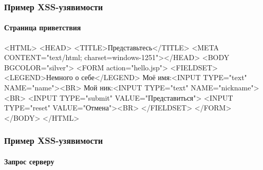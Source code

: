 \begin{frame}[fragile]
    \frametitle{Пример XSS-узявимости}
    \framesubtitle{Страница приветствия}
    
    \begin{semiverbatim}
<HTML> 
  <HEAD> <TITLE>Представьтесь</TITLE>
     <META CONTENT="text/html; charset=windows-1251"></HEAD>
  <BODY BGCOLOR="silver">
     <FORM action="hello.jsp">
        <FIELDSET>  <LEGEND>Немного о себе</LEGEND>
           Моё имя:<INPUT TYPE="text" NAME="name"><BR>
           Мой ник:<INPUT TYPE="text" NAME="nickname"><BR>
           <INPUT TYPE="submit" VALUE="Представиться"> 
           <INPUT TYPE="reset" VALUE="Отмена"><BR>
        </FIELDSET>
     </FORM>
  </BODY>
</HTML>
    \end{semiverbatim}
\end{frame}

\begin{frame}[fragile]
    \frametitle{Пример XSS-узявимости}
    \framesubtitle{Запрос серверу}
    
    
\end{frame}

